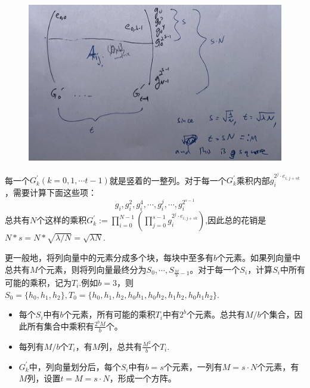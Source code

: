 \documentclass[10pt]{ctexart}
\begin{document}
\begin{figure}[H]
    \centering
    \includegraphics[width=1\textwidth]{./img/matrix.png} 
\end{figure}
每一个$G_k^{\prime}(k = 0, 1, \cdots t-1)$就是竖着的一整列。对于每一个$G_k^{\prime}$乘积内部$g_i^{2^{j} \cdot e_{i,j+sk}}$，需要计算下面这些项：
$$
g_i,g_i^2,g_i^4, \cdots, g_i^j, \cdots,g_i^{2^{s-1}}
$$
总共有$N$个这样的乘积$G_k^{\prime} := \prod_{i=0}^{N-1} \left(\prod_{j=0}^{s-1}  g_i^{2^{j} \cdot e_{i,j+sk}}\right)$,因此总的花销是$N * s = N * \sqrt{\lambda / N} = \sqrt{\lambda N}$.

更一般地，将列向量中的元素分成多个块，每块中至多有$b$个元素。如果列向量中总共有$M$个元素，则将列向量最终分为$S_0, \cdots, S_{\frac{M}{b}-1}$。对于每一个$S_i$，计算$S_i$中所有可能的乘积，记为$T_i$.例如$b=3$，则$S_0=\{h_0,h_1,h_2\},T_0=\{h_0,h_1,h_2,h_0h_1,h_0h_2,h_1h_2,h_0h_1h_2\}.$
\begin{itemize}
    \item 每个$S_i$中有$b$个元素，所有可能的乘积$T_i$中有$2^b$个元素。总共有$M/b$个集合，因此所有集合中乘积有$\frac{2^bM}{b}$个。
    \item 每列有$M/b$个$T_i$，有$M$列，总共有$\frac{M^2}{b}$个$T_i$.
    \item $G_k^{\prime}$中，列向量划分后，每个$S_i$中有$b=s$个元素，一列有$M = s \cdot N$个元素，有$M$列，设置$t = M = s \cdot N$，形成一个方阵。
\end{itemize}
\end{document}
